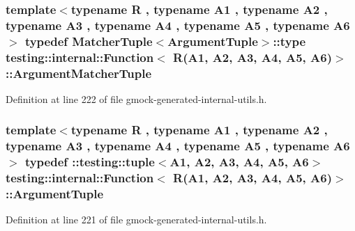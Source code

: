 \subsubsection[{\texorpdfstring{Argument\+Matcher\+Tuple}{ArgumentMatcherTuple}}]{\setlength{\rightskip}{0pt plus 5cm}template$<$typename R , typename A1 , typename A2 , typename A3 , typename A4 , typename A5 , typename A6 $>$ typedef {\bf Matcher\+Tuple}$<${\bf Argument\+Tuple}$>$\+::type {\bf testing\+::internal\+::\+Function}$<$ {\bf R}(A1, A2, A3, A4, A5, A6)$>$\+::{\bf Argument\+Matcher\+Tuple}}\hypertarget{structtesting_1_1internal_1_1_function_3_01_r_07_a1_00_01_a2_00_01_a3_00_01_a4_00_01_a5_00_01_a6_08_4_a8555cb8e68c1e64b91b6c50a7b5951bd}{}\label{structtesting_1_1internal_1_1_function_3_01_r_07_a1_00_01_a2_00_01_a3_00_01_a4_00_01_a5_00_01_a6_08_4_a8555cb8e68c1e64b91b6c50a7b5951bd}


Definition at line 222 of file gmock-\/generated-\/internal-\/utils.\+h.

\subsubsection[{\texorpdfstring{Argument\+Tuple}{ArgumentTuple}}]{\setlength{\rightskip}{0pt plus 5cm}template$<$typename R , typename A1 , typename A2 , typename A3 , typename A4 , typename A5 , typename A6 $>$ typedef \+::testing\+::tuple$<$A1, A2, A3, A4, A5, A6$>$ {\bf testing\+::internal\+::\+Function}$<$ {\bf R}(A1, A2, A3, A4, A5, A6)$>$\+::{\bf Argument\+Tuple}}\hypertarget{structtesting_1_1internal_1_1_function_3_01_r_07_a1_00_01_a2_00_01_a3_00_01_a4_00_01_a5_00_01_a6_08_4_a3120b03652156e1475ce5892e1b5dd7a}{}\label{structtesting_1_1internal_1_1_function_3_01_r_07_a1_00_01_a2_00_01_a3_00_01_a4_00_01_a5_00_01_a6_08_4_a3120b03652156e1475ce5892e1b5dd7a}


Definition at line 221 of file gmock-\/generated-\/internal-\/utils.\+h.

